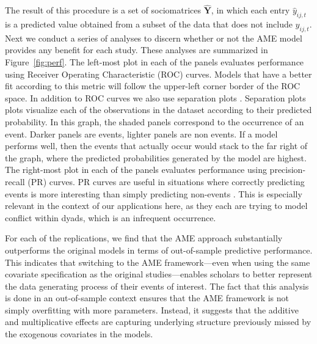 The result of this procedure is a set of sociomatrices $\bm \hat Y$, in which each entry $\hat y_{ij,t}$ is a predicted value obtained from a subset of the data that does not include $y_{ij,t}$. Next we conduct a series of analyses to discern whether or not the AME model provides any benefit for each study. These analyses are summarized in Figure~\ref{fig:perf}. The left-most plot in each of the panels evaluates performance using Receiver Operating Characteristic (ROC) curves. Models that have a better fit according to this metric will follow the upper-left corner border of the ROC space. In addition to ROC curves we also use separation plots \citep{greenhill:etal:2011}.  Separation plots plots visualize each of the observations in the dataset according to their predicted probability. In this graph, the shaded panels correspond to the occurrence of an event. Darker panels are events, lighter panels are non events. If a model performs well, then the events that actually occur would stack to the far right of the graph, where the predicted probabilities generated by the model are highest. The right-most plot in each of the panels evaluates performance using precision-recall (PR) curves. PR curves are useful in situations where correctly predicting events is more interesting than simply predicting non-events \citep{davis:goadrich:2006}. This is especially relevant in the context of our applications here, as they each are trying to model conflict within dyads, which is an infrequent occurrence. 

For each of the replications, we find that the AME approach substantially outperforms the original models in terms of out-of-sample predictive performance. This indicates that switching to the AME framework---even when using the same covariate specification as the original studies---enables scholars to better represent the data generating process of their events of interest. The fact that this analysis is done in an out-of-sample context ensures that the AME framework is not simply overfitting with more parameters. Instead, it suggests that the additive and multiplicative effects are capturing underlying structure previously missed by the exogenous covariates in the models.

